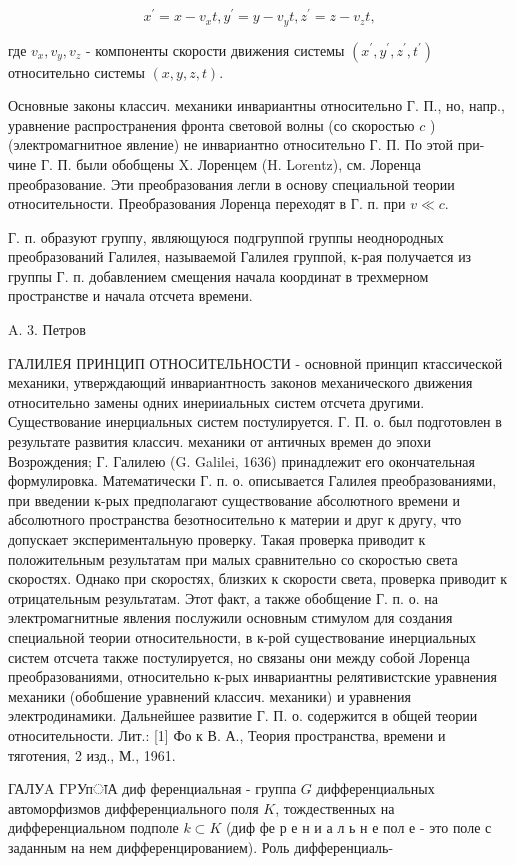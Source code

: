 \documentclass[10pt]{article}
\begin{document}
\[

x^{\prime}=x-v_{x} t, y^{\prime}=y-v_{y} t, z^{\prime}=z-v_{z} t,

\]



где $v_{x}, v_{y}, v_{z}$ - компоненты скорости движения системы $\left(x^{\prime}, y^{\prime}, z^{\prime}, t^{\prime}\right)$ относительно системы $(x, y, z, t)$.



Основные законы классич. механики инвариантны относительно Г. П., но, напр., уравнение распространения фронта световой волны (со скоростью $c$ ) (электромагнитное явление) не инвариантно относительно Г. П. По этой при- чине Г. П. были обобщены X. Лоренцем (H. Lorentz), см. Лоренца преобразование. Эти преобразования легли в основу специальной теории относительности. Преобразования Лоренца переходят в Г. п. при $v \ll c$.



Г. п. образуют группу, являющуюся подгруппой группы неоднородных преобразований Галилея, называемой Галилея группой, к-рая получается из группы Г. п. добавлением смещения начала координат в трехмерном пространстве и начала отсчета времени.



A. 3. Петров



ГАЛИЛЕЯ ПРИНЦИП ОТНОСИТЕЛЬНОСТИ - основной принцип ктассической механики, утверждающий инвариантность законов механического движения относительно замены одних инерииальных систем отсчета другими. Существование инерциальных систем постулируется. Г. П. о. был подготовлен в результате развития классич. механики от античных времен до эпохи Возрождения; Г. Галилею (G. Galilei, 1636) принадлежит его окончательная формулировка. Математически Г. п. о. описывается Галилея преобразованиями, при введении к-рых предполагают существование абсолютного времени и абсолютного пространства безотносительно к материи и друг к другу, что допускает экспериментальную проверку. Такая проверка приводит к положительным результатам при малых сравнительно со скоростью света скоростях. Однако при скоростях, близких к скорости света, проверка приводит к отрицательным результатам. Этот факт, а также обобщение Г. п. о. на электромагнитные явления послужили основным стимулом для создания специальной теории относительности, в к-рой существование инерциальных систем отсчета также постулируется, но связаны они между собой Лоренца преобразованиями, относительно к-рых инвариантны релятивистские уравнения механики (обобшение уравнений классич. механики) и уравнения электродинамики. Дальнейшее развитие Г. П. о. содержится в общей теории относительности. Лит.: [1] Фо к В. А., Теория пространства, времени и тяготения, 2 изд., М., 1961.



ГАЛУA ГPУпाА диф ференциальная - группа $G$ дифференциальных автоморфизмов дифференциального поля $K$, тождественных на дифференциальном подполе $k \subset K$ (диф фе р е н и а л ь н е пол е - это поле с заданным на нем дифференцированием). Роль дифференциаль-
\end{document}
